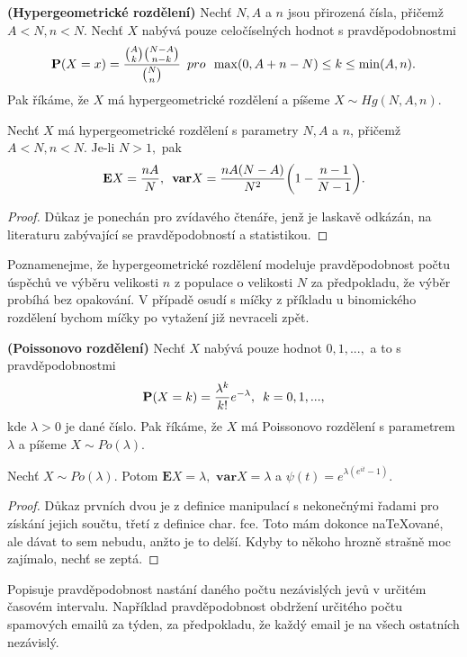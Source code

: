 \begin{definition}{\textbf{(Hypergeometrické rozdělení)}}
Nechť $N, A$ a $n$ jsou přirozená čísla, přičemž $A < N, n < N$. Nechť $X$ nabývá pouze celočíselných hodnot s pravděpodobnostmi 
\begin{equation}
\textbf{P}(X = x)= \frac{\binom{A}{k}\binom{N-A}{n-k}}{\binom{N}{n}} \enskip pro \enskip \max(0, A + n -N)\leq k \leq \min(A, n).
\end{equation}
Pak říkáme, že $X$ má hypergeometrické rozdělení a píšeme $X \sim Hg(N,A,n)$.
\end{definition}
\begin{proposition}
Nechť $X$ má hypergeometrické rozdělení s parametry $N, A$ a $n$, přičemž $A < N, n < N$.  Je-li $N > 1,$ pak 
\begin{equation}
\mathbf{E}X = \frac{nA}{N}, \enskip \mathbf{var}X = \frac{nA(N-A)}{N^{2}}\bigg( 1 - \frac{n-1}{N-1}\bigg).
\end{equation}
\end{proposition}
\begin{proof}
Důkaz je ponechán pro zvídavého čtenáře, jenž je laskavě odkázán, na literaturu zabývající se pravděpodobností a statistikou.
\end{proof}

\begin{remark}
Poznamenejme, že hypergeometrické rozdělení modeluje pravděpodobnost počtu úspěchů ve výběru velikosti $n$ z populace o velikosti $N$ za předpokladu, že výběr probíhá bez opakování. V případě osudí s míčky z příkladu u binomického rozdělení bychom míčky po vytažení již nevraceli zpět.
\end{remark}

\begin{definition}{\textbf{(Poissonovo rozdělení)}}
Nechť $X$ nabývá pouze hodnot $0, 1, ..., $ a to s pravděpodobnostmi 
\begin{equation}
\textbf{P}(X = k) = \frac{\lambda^{k}}{k!}e^{-\lambda},\enskip k = 0, 1, ...,
\end{equation}
kde $\lambda >0$ je dané číslo. Pak říkáme, že $X$ má Poissonovo rozdělení s parametrem $\lambda$ a píšeme $X \sim Po(\lambda)$.
\end{definition}

\begin{proposition}
Nechť $X \sim Po(\lambda)$. Potom $\mathbf{E}X = \lambda,$ $\mathbf{var}X = \lambda$ a $\psi(t) = e^{\lambda(e^{it}-1)}$.
\end{proposition}
\begin{proof}
Důkaz prvních dvou je z definice manipulací s nekonečnými řadami pro získání jejich součtu, třetí z definice char. fce. Toto mám dokonce naTeXované, ale dávat to sem nebudu, anžto je to delší. Kdyby to někoho hrozně strašně moc zajímalo, nechť se zeptá.
\end{proof}
\begin{remark}
Popisuje pravděpodobnost nastání daného počtu nezávislých jevů v určitém časovém intervalu. Například pravděpodobnost obdržení určitého počtu spamových emailů za týden, za předpokladu, že každý email je na všech ostatních nezávislý.
\end{remark}

